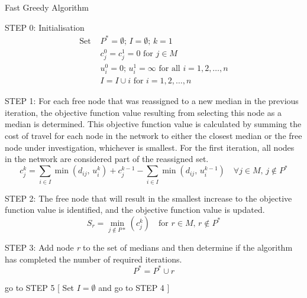 \documentclass[11pt]{article}
\begin{document}
\begin{algorithm}
	\caption{Fast Greedy Algorithm}
	\begin{algorithmic}[0]
		
		\Statex
		\Statex STEP 0: Initialisation 	
		\begin{align*}
			\text{Set } & P^{*} = \emptyset \text{; } I = \emptyset \text{; } k = 1\\
			& c_j^0=c_j^1 = 0 \text{ for }j\in M\\
			& u_i^0 = 0 \text{; } u_i^1 = \infty\text{ for all } i=1,2,\dots,n\\
			& I=I\cup i \text{ for } i=1,2,\dots,n
		\end{align*}
		
		\Statex
		\Statex STEP 1: For each free node that was reassigned to a new median in the previous iteration, the objective function value resulting from selecting this node as a median is determined.  This objective function value is calculated by summing the cost of travel for each node in the network to either the closest median or the free node under investigation, whichever is smallest.  For the first iteration, all nodes in the network are considered part of the reassigned set.
		\begin{equation*}
			c_j^k = \sum_{i\in I}\min(d_{ij} \text{, } u_i^k) + c_j^{k-1} - \sum_{i\in I}\min(d_{ij} \text{, } u_i^{k-1})\quad \forall j \in M \text{, } j \notin P^*
		\end{equation*}
		
		\Statex
		\Statex STEP 2: The free node that will result in the smallest increase to the objective function value is identified, and the objective function value is updated.
		\begin{equation*}
			S_r = \min_{j \notin P*}(c_j^k) \quad \text{for } r \in M \text{, } r \notin P^*
		\end{equation*}
		
		\Statex
		\Statex STEP 3: Add node \emph{r} to the set of medians and then determine if the algorithm has completed the number of required iterations.
		\begin{equation*}
			P^* = P^* \cup r
		\end{equation*}
		
		\Statex go to STEP 5
		[
		\Else
		\Statex Set $I = \emptyset$ and go to STEP 4
		]
		\EndIf
		

\end{algorithmic}
\end{algorithm}
\end{document}
